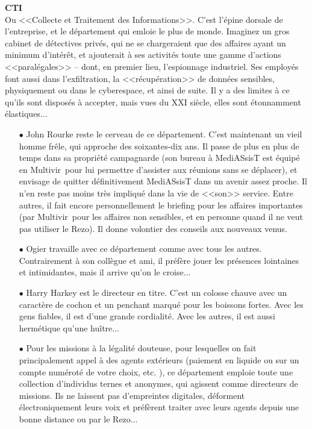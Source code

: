 \documentclass[11pt,twoside,a4paper]{article}
\begin{document}
\begin{multicols}{2}
\textbf{\large CTI}~\\
Ou <<Collecte et Traitement des Informations>>. C'est l'{\'e}pine dorsale de l'entreprise, et le d{\'e}partement qui emloie le plus de monde. Imaginez un gros cabinet de d{\'e}tectives priv{\'e}s, qui ne se chargeraient que des affaires ayant un minimum d'int{\'e}r{\^e}t, et ajouterait {\`a} ses activit{\'e}s toute une gamme d'actions <<paral{\'e}gales>> -- dont, en premier lieu, l'espionnage industriel. Ses employ{\'e}s font aussi dans l'exfiltration, la <<r{\'e}cup{\'e}ration>> de donn{\'e}es sensibles, physiquement ou dans le cyberespace, et ainsi de suite. Il y a des limites {\`a} ce qu'ils sont dispos{\'e}s {\`a} accepter, mais vues du XXI si{\`e}cle, elles sont {\'e}tonnamment {\'e}lastiques...
\begin{itemize}
	\item[$\bullet$] John Rourke reste le cerveau de ce d{\'e}partement. C'est maintenant un vieil homme fr{\^e}le, qui approche des soixantes-dix ans. Il passe de plus en plus de temps dans sa propri{\'e}t{\'e} campagnarde (son bureau {\`a} MediASsisT est {\'e}quip{\'e} en Multivir\texttrademark ~pour lui permettre d'assister aux r{\'e}unions sans se d{\'e}placer), et envisage de quitter d{\'e}finitivement MediASsisT dans un avenir assez proche. Il n'en reste pas moins tr{\`e}s impliqu{\'e} dans la vie de <<son>> service. Entre autres, il fait encore personnellement le briefing pour les affaires importantes (par Multivir\texttrademark ~pour les affaires non sensibles, et en personne quand il ne veut pas utiliser le Rezo). Il donne volontier des conseils aux nouveaux venus. %
	\item[$\bullet$] Ogier travaille avec ce d{\'e}partement comme avec tous les autres. Contrairement {\`a} son coll{\`e}gue et ami, il pr{\'e}f{\`e}re jouer les pr{\'e}sences lointaines et intimidantes, mais il arrive qu'on le croise...
	\item[$\bullet$] Harry Harkey est le directeur en titre. C'est un colosse chauve avec un caract{\`e}re de cochon et un penchant marqu{\'e} pour les boissons fortes. Avec les gens fiables, il est d'une grande cordialit{\'e}. Avec les autres, il est aussi herm{\'e}tique qu'une hu{\^i}tre... 
	\item[$\bullet$] Pour les missions {\`a} la l{\'e}galit{\'e} douteuse, pour lesquelles on fait principalement appel {\`a} des agents ext{\'e}rieurs (paiement en liquide ou sur un compte num{\'e}rot{\'e} de votre choix, etc. ), ce d{\'e}partement emploie toute une collection d'individus ternes et anonymes, qui agissent comme directeurs de missions. Ils ne laissent pas d'empreintes digitales, d{\'e}forment {\'e}lectroniquement leurs voix et pr{\'e}f{\`e}rent traiter avec leurs agents depuis une bonne distance ou par le Rezo...
\end{itemize} %


\end{multicols}
\end{document}
